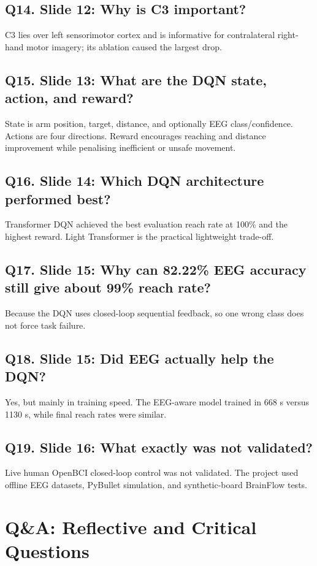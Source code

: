 \documentclass[11pt]{article}
\begin{document}
\subsection*{Q14. Slide 12: Why is C3 important?}
C3 lies over left sensorimotor cortex and is informative for contralateral right-hand motor imagery; its ablation caused the largest drop.


\subsection*{Q15. Slide 13: What are the DQN state, action, and reward?}
State is arm position, target, distance, and optionally EEG class/confidence. Actions are four directions. Reward encourages reaching and distance improvement while penalising inefficient or unsafe movement.


\subsection*{Q16. Slide 14: Which DQN architecture performed best?}
Transformer DQN achieved the best evaluation reach rate at 100\% and the highest reward. Light Transformer is the practical lightweight trade-off.


\subsection*{Q17. Slide 15: Why can 82.22\% EEG accuracy still give about 99\% reach rate?}
Because the DQN uses closed-loop sequential feedback, so one wrong class does not force task failure.


\subsection*{Q18. Slide 15: Did EEG actually help the DQN?}
Yes, but mainly in training speed. The EEG-aware model trained in 668 s versus 1130 s, while final reach rates were similar.


\subsection*{Q19. Slide 16: What exactly was not validated?}
Live human OpenBCI closed-loop control was not validated. The project used offline EEG datasets, PyBullet simulation, and synthetic-board BrainFlow tests.


\newpage
\section*{Q\&A: Reflective and Critical Questions}
\end{document}
